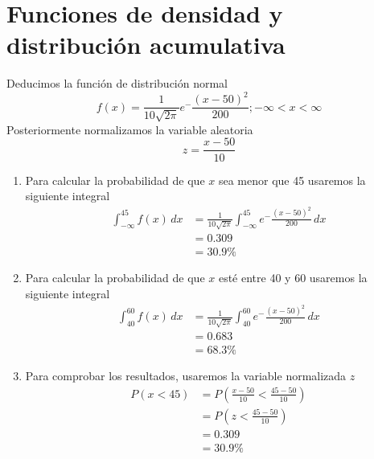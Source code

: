 \documentclass[12pt, letterpaper]{article}
\begin{document}
\section{Funciones de densidad y distribución acumulativa}
Deducimos la función de distribución normal
\begin{equation*}
    f(x) = \frac{1}{10\sqrt{2\pi}}e^-{\frac{(x-50)^{2}}{200}}; -\infty < x < \infty 
\end{equation*}
Posteriormente normalizamos la variable aleatoria
\begin{equation*}
    z = \frac{x-50}{10}
\end{equation*}
\begin{enumerate}
    \item Para calcular la probabilidad de que $x$ sea menor que 45 usaremos la siguiente integral
    \begin{equation*}
        \begin{aligned}
            \int_{-\infty}^{45} f(x) \,dx 
            & = \frac{1}{10\sqrt{2\pi}} \int_{-\infty}^{45} e^-{\frac{(x-50)^{2}}{200}} \,dx \\
            & = 0.309 \\
            & = 30.9\%
        \end{aligned}
    \end{equation*}
    \item Para calcular la probabilidad de que $x$ esté entre 40 y 60 usaremos la siguiente integral
    \begin{equation*}
        \begin{aligned}
            \int_{40}^{60} f(x) \,dx 
            & = \frac{1}{10\sqrt{2\pi}} \int_{40}^{60} e^-{\frac{(x-50)^{2}}{200}} \,dx \\
            & = 0.683 \\
            & = 68.3\%
        \end{aligned}
    \end{equation*}
    \item Para comprobar los resultados, usaremos la variable normalizada $ z $
    \begin{equation*}
        \begin{aligned}
            P(x < 45)
            & = P(\frac{x-50}{10} < \frac{45-50}{10}) \\
            & = P(z < \frac{45-50}{10}) \\
            & = 0.309 \\
            & = 30.9\%
        \end{aligned}

\end{equation*}
\end{enumerate}
\end{document}
